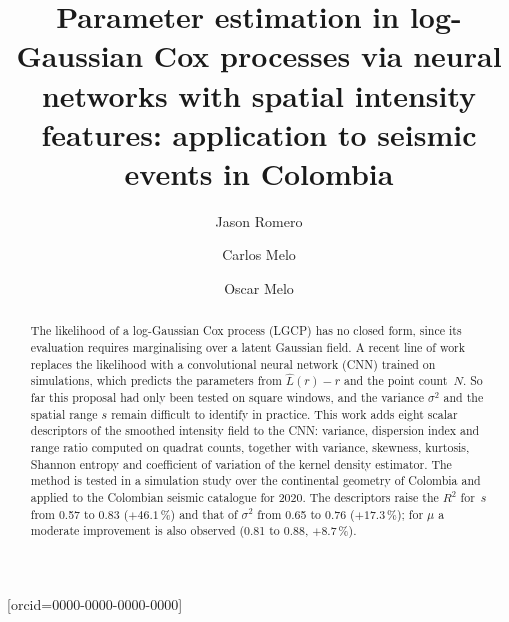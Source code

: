 \documentclass[a4paper,fleqn]{cas-sc}
\numberwithin{equation}{section}
\begin{document}
\let\WriteBookmarks\relax


\title[mode=title]{Parameter estimation in log-Gaussian Cox processes
via neural networks with spatial intensity features:
application to seismic events in Colombia}

\author[1]{Jason Romero}[orcid=0000-0000-0000-0000]
\cormark[1]


\author[2]{Carlos Melo}


\author[3]{Oscar Melo}



\begin{abstract}
The likelihood of a log-Gaussian Cox process (LGCP) has no closed form,
since its evaluation requires marginalising over a latent Gaussian field.
A recent line of work replaces the likelihood with a convolutional neural
network (CNN) trained on simulations, which predicts the parameters from
$\hat{L}(r)-r$ and the point count~$N$. So far this proposal had only
been tested on square windows, and the variance $\sigma^2$ and the
spatial range $s$ remain difficult to identify in practice. This work
adds eight scalar descriptors of the smoothed intensity field to the
CNN: variance, dispersion index and range ratio computed on quadrat
counts, together with variance, skewness, kurtosis, Shannon entropy and
coefficient of variation of the kernel density estimator. The method is
tested in a simulation study over the continental geometry of Colombia
and applied to the Colombian seismic catalogue for 2020. The descriptors
raise the $R^2$ for~$s$ from 0.57 to 0.83 ($+46.1$\,\%) and that of
$\sigma^2$ from 0.65 to 0.76 ($+17.3$\,\%); for $\mu$ a moderate
improvement is also observed (0.81 to 0.88, $+8.7$\,\%).
\end{abstract}
\end{document}
